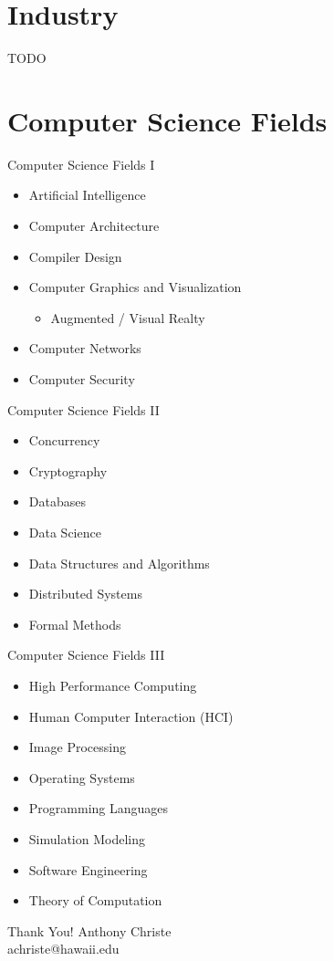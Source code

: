 \documentclass{beamer}
\begin{document}
\section{Industry}
TODO

\section{Computer Science Fields}

\begin{frame}{Computer Science Fields I}
\begin{itemize}
	\item Artificial Intelligence
	\item Computer Architecture
	\item Compiler Design
	\item Computer Graphics and Visualization
	\begin{itemize}
		\item Augmented / Visual Realty
	\end{itemize}
	\item Computer Networks
	\item Computer Security
\end{itemize}
\end{frame}

\begin{frame}{Computer Science Fields II}
\begin{itemize}
	\item Concurrency
	\item Cryptography
	\item Databases
	\item Data Science
	\item Data Structures and Algorithms
	\item Distributed Systems
	\item Formal Methods
\end{itemize}
\end{frame}

\begin{frame}{Computer Science Fields III}
\begin{itemize}

	\item High Performance Computing
	\item Human Computer Interaction (HCI)
	\item Image Processing
	\item Operating Systems
	\item Programming Languages
	\item Simulation Modeling
	\item Software Engineering
	\item Theory of Computation
\end{itemize}
\end{frame}

\begin{frame}{Thank You!}
Anthony Christe \\
achriste@hawaii.edu
\end{frame}
\end{document}
